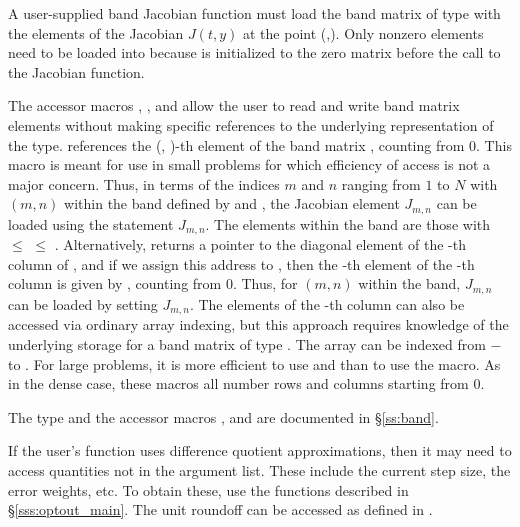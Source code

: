 {
  A user-supplied band Jacobian function must load the band matrix 
  of type  with the elements of the Jacobian $J(t,y)$ at the
  point (,).  Only nonzero elements need to be loaded into
   because  is initialized to the zero matrix before the call to the
  Jacobian function.  

  The accessor macros , , and  
  allow the user to read and write band matrix elements without making specific 
  references to the underlying representation of the  type.
   references the (, )-th element of the 
  band matrix , counting from $0$.
  This macro is meant for use in small problems for which efficiency of access is not
  a major concern.  Thus, in terms of the indices $m$ and $n$ ranging from $1$ to
  $N$ with $(m,n)$ within the band defined by  and
  , the Jacobian element $J_{m,n}$ can be loaded using the 
  statement  $J_{m,n}$. The elements within
  the band are those with  $\le$  $\le$ .
  Alternatively,  returns a pointer to the diagonal element
  of the -th column of , and if we assign this address to 
  , then the -th element of the -th column is
  given by , counting from $0$.
  Thus, for $(m,n)$ within the band, $J_{m,n}$ can be loaded by setting 
   
  $J_{m,n}$.  The elements of the -th column can also be accessed
  via ordinary array indexing, but this approach requires knowledge of
  the underlying storage for a band matrix of type .  
  The array  can be indexed from $-$ to .
  For large problems, it is more efficient to use
   and  than to use the
   macro.  As in the dense case, these macros all number rows
  and columns starting from $0$.  

  The  type and the accessor macros ,  and
   are documented in \S\ref{ss:band}.

  If the user's  function uses difference quotient approximations, then
  it may need to access quantities not in the argument list. These include the current
  step size, the error weights, etc. To obtain these, use the 
  functions described in \S\ref{sss:optout_main}. The unit roundoff can be
  accessed as  defined in .
}

